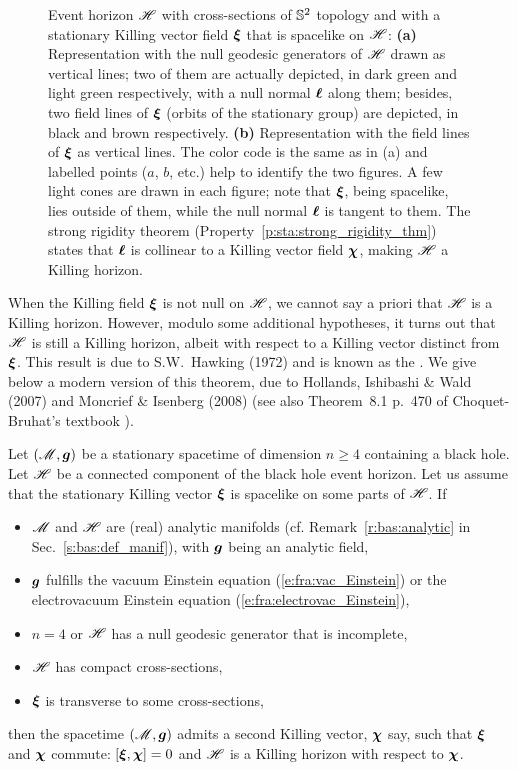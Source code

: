 \begin{figure}
\caption[]{\label{f:sta:rot_horizon} \footnotesize
Event horizon $\mathscr{H}$ with cross-sections of $\mathbb{S}^2$ topology
and with a stationary Killing vector field $\bm{\xi}$ that is
spacelike on $\mathscr{H}$:
\textbf{(a)} Representation with the null geodesic generators of $\mathscr{H}$ drawn as vertical
lines; two of them are actually depicted, in dark green and light green
respectively, with a null normal $\bm{\ell}$ along them; besides,
two field lines of $\bm{\xi}$
(orbits of the stationary group) are depicted, in black and brown
respectively.
\textbf{(b)} Representation with the field lines of $\bm{\xi}$ as vertical lines.
The color code is the same as in (a) and
labelled points ($a$, $b$, etc.) help to identify
the two figures. A few light cones are drawn in each figure; note that $\bm{\xi}$,
being spacelike, lies outside of them,
while the null normal $\bm{\ell}$ is tangent to them.
The strong rigidity theorem (Property~\ref{p:sta:strong_rigidity_thm}) states that
$\bm{\ell}$ is collinear to a Killing vector field $\bm{\chi}$, making $\mathscr{H}$
a Killing horizon.}
\end{figure}

When the Killing field $\bm{\xi}$ is not null on $\mathscr{H}$, we cannot say a priori
that $\mathscr{H}$ is a Killing horizon. However, modulo some additional hypotheses,
it turns out that $\mathscr{H}$ is still a Killing horizon, albeit with
respect to a Killing vector distinct from $\bm{\xi}$. This result is due to
S.W.~Hawking (1972)
\cite{Hawki72,HawkiE73} and is known as the
.
We give below a modern version of this theorem, due to
Hollands, Ishibashi \& Wald (2007) \cite{HollaIW07}
and Moncrief \& Isenberg (2008) \cite{MoncrI08} (see also
Theorem~8.1 p.~470 of Choquet-Bruhat's textbook \cite{Choqu09}).

\begin{prop}
\label{p:sta:strong_rigidity_thm}
Let $(\mathscr{M},\bm{g})$ be a stationary spacetime of dimension $n\geq 4$ containing a black
hole. Let $\mathscr{H}$ be a connected component of the black hole event horizon.
Let us assume that the stationary Killing vector $\bm{\xi}$
is spacelike on some parts of $\mathscr{H}$. If
\begin{itemize}
\item $\mathscr{M}$ and $\mathscr{H}$ are (real) analytic manifolds
(cf. Remark~\ref{r:bas:analytic} in Sec.~\ref{s:bas:def_manif}),
with $\bm{g}$ being an analytic field,
\item $\bm{g}$ fulfills the vacuum Einstein equation (\ref{e:fra:vac_Einstein})
or the electrovacuum Einstein equation (\ref{e:fra:electrovac_Einstein}),
\item $n=4$ or $\mathscr{H}$ has a null geodesic generator that is incomplete,
\item $\mathscr{H}$ has compact cross-sections,
\item $\bm{\xi}$ is transverse to some cross-sections,
\end{itemize}
then the spacetime $(\mathscr{M},\bm{g})$ admits a second Killing vector, $\bm{\chi}$
say, such that $\bm{\xi}$ and $\bm{\chi}$ commute: $[\bm{\xi}, \bm{\chi}] = 0$ and
$\mathscr{H}$ is a Killing horizon with respect to $\bm{\chi}$.
\end{prop}

